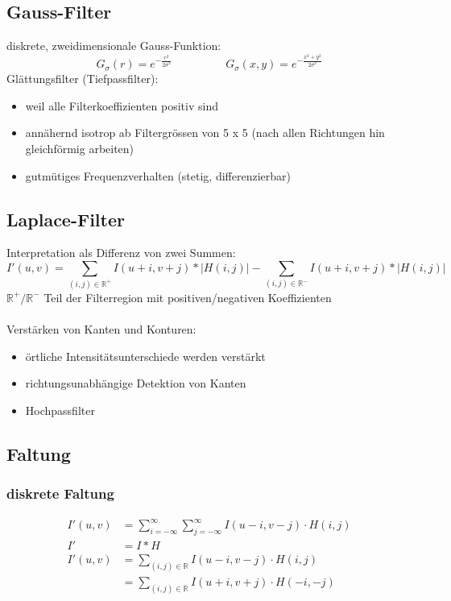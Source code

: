 \documentclass[10pt]{article}
\newcommand{\RN}{\mathbb{R}} %
\begin{document}
\subsection{Gauss-Filter}
diskrete, zweidimensionale Gauss-Funktion:
\begin{equation*}
	G_\sigma(r) = e^{-\frac{r^2}{2\sigma^2}} \hspace{2cm} G_\sigma(x, y) = e^{-\frac{x^2+y^2}{2\sigma^2}}
\end{equation*}
Glättungsfilter (Tiefpassfilter):
\begin{itemize}
	\item weil alle Filterkoeffizienten positiv sind
	\item annähernd isotrop ab Filtergrössen von 5 x 5 (nach allen Richtungen hin gleichförmig arbeiten)
	\item gutmütiges Frequenzverhalten (stetig, differenzierbar)
\end{itemize}

\subsection{Laplace-Filter}
Interpretation als Differenz von zwei Summen:
\begin{equation*}
	I'(u,v) = \sum_{(i,j)\in \RN^+} I(u+i,v+j)*|H(i,j)| - \sum_{(i,j)\in \RN^-} I(u+i,v+j)*|H(i,j)|
\end{equation*}
$\RN^+/\RN^-$ Teil der Filterregion mit positiven/negativen Koeffizienten \\
\\
Verstärken von Kanten und Konturen:
\begin{itemize}
	\item örtliche Intensitätsunterschiede werden verstärkt
	\item richtungsunabhängige Detektion von Kanten
	\item Hochpassfilter
\end{itemize}

\subsection{Faltung}
\subsubsection{diskrete Faltung}
\begin{align*}
	I'(u,v) &= \sum_{i=-\infty}^\infty \sum_{j=-\infty}^\infty I(u-i,v-j) \cdot H(i,j) \\
	I' &= I*H \\
	I'(u,v) &= \sum_{(i,j) \in \RN} I(u-i,v-j) \cdot H(i,j) \\
	 &= \sum_{(i,j) \in \RN} I(u+i,v+j) \cdot H(-i,-j) \\
\end{align*}
\end{document}
